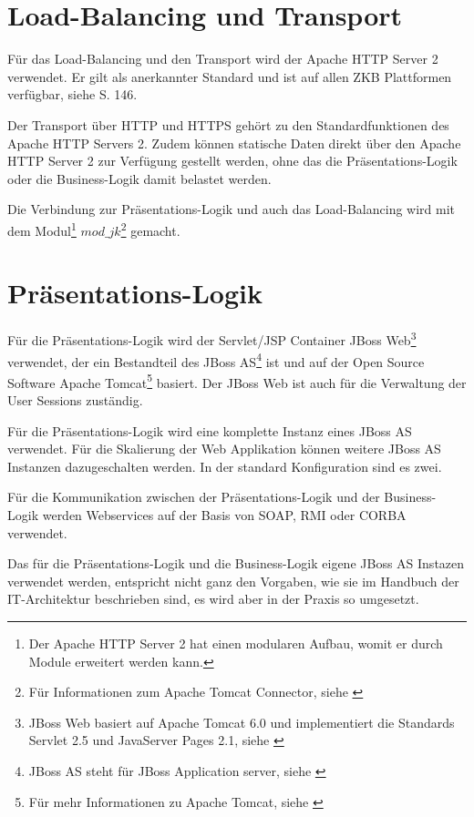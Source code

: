   \section{Load-Balancing und Transport}
  
  Für das Load-Balancing und den Transport wird der Apache HTTP Server 2
  verwendet. Er gilt als anerkannter Standard und ist auf allen ZKB Plattformen
  verfügbar, siehe \cite{ZkbHandbuchDerItArchitektur} S. 146.
  
  Der Transport über \ac{HTTP} und \ac{HTTPS} gehört zu den Standardfunktionen
  des Apache HTTP Servers 2. Zudem können statische Daten direkt über den Apache HTTP
  Server 2 zur Verfügung gestellt werden, ohne das die Präsentations-Logik oder
  die Business-Logik damit belastet werden.
  
  Die Verbindung zur Präsentations-Logik und auch das Load-Balancing wird mit
  dem Modul\footnote{Der Apache HTTP Server 2 hat einen modularen Aufbau, womit
  er durch Module erweitert werden kann.} \(mod\_jk\)\footnote{Für
  Informationen zum Apache Tomcat Connector, siehe \cite{ModJk}} gemacht.
  
  \section{Präsentations-Logik}
  
  Für die Präsentations-Logik wird der Servlet/JSP Container JBoss
  Web\footnote{JBoss Web basiert auf Apache Tomcat 6.0 und implementiert die
  Standards Servlet 2.5 und JavaServer Pages 2.1, siehe \cite{JBossWeb}}
  verwendet, der ein Bestandteil des JBoss AS\footnote{JBoss AS steht für JBoss
  Application server, siehe \cite{JBossAS}} ist und auf der Open Source Software
  Apache Tomcat\footnote{Für mehr Informationen zu Apache Tomcat, siehe
  \cite{ApacheTomcat}} basiert. Der JBoss Web ist auch für die Verwaltung der
  User Sessions zuständig.
  
  Für die Präsentations-Logik wird eine komplette Instanz eines JBoss AS
  verwendet. Für die Skalierung der Web Applikation können weitere
  JBoss AS Instanzen dazugeschalten werden. In der standard Konfiguration sind
  es zwei.
  
  Für die Kommunikation zwischen der Präsentations-Logik und der Business-Logik
  werden Webservices auf der Basis von \ac{SOAP}, \ac{RMI} oder \ac{CORBA}
  verwendet.
  
  Das für die Präsentations-Logik und die Business-Logik eigene JBoss AS
  Instazen verwendet werden, entspricht nicht ganz den Vorgaben, wie sie
  im Handbuch der IT-Architektur beschrieben sind, es wird aber in der Praxis so
  umgesetzt.
    
